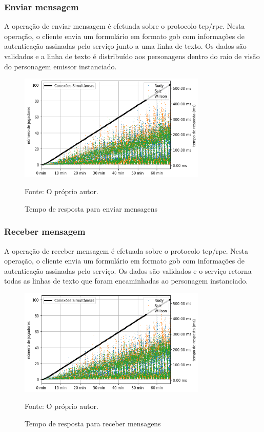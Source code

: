 \subsubsection{Enviar mensagem}

A operação de enviar mensagem é efetuada sobre o protocolo \ac{tcp}/\ac{rpc}.
%
Nesta operação, o cliente envia um formulário em formato \ac{gob} com informações de autenticação assinadas pelo serviço junto a uma linha de texto.
%
Os dados são validados e a linha de texto é distribuído aos personagens dentro do raio de visão do personagem emissor instanciado.

\begin{figure}[htb!]
  \caption{Tempo de resposta para enviar mensagens}
  \label{fig:send_chat_request_time}
  \includegraphics[width=0.8\textwidth]{figuras/analise/rt/send_chat_request_time}
  \centering

  Fonte: O próprio autor.
\end{figure}

\subsubsection{Receber mensagem}

A operação de receber mensagem é efetuada sobre o protocolo \ac{tcp}/\ac{rpc}.
%
Nesta operação, o cliente envia um formulário em formato \ac{gob} com informações de autenticação assinadas pelo serviço.
%
Os dados são validados e o serviço retorna todas as linhas de texto que foram encaminhadas ao personagem instanciado.

\begin{figure}[htb!]
  \caption{Tempo de resposta para receber mensagens}
  \label{fig:listen_chat_request_time}
  \includegraphics[width=0.8\textwidth]{figuras/analise/rt/listen_chat_request_time}
  \centering

  Fonte: O próprio autor.
\end{figure}


